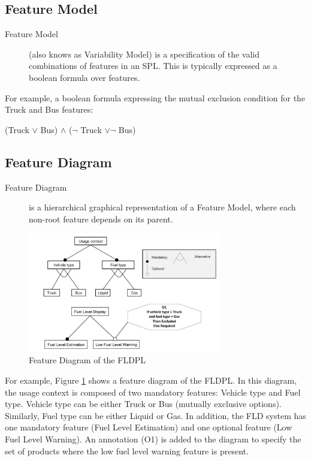 \documentclass[11pt]{article}
\begin{document}
\subsection{Feature Model}

\begin{description}

\item[Feature Model]
(also knows as Variability Model) is a specification of the valid combinations of features in an SPL. This is typically expressed as a boolean formula over features.

\end{description}

For example, a boolean formula expressing the mutual exclusion condition for the Truck and Bus features:

(Truck $\vee$ Bus) $\wedge$ ($\neg$ Truck $\vee \neg$ Bus)

\subsection{Feature Diagram}

\begin{description}

\item[Feature Diagram]
is a hierarchical graphical representation of a Feature Model, where each non-root feature depends on its parent.

\end{description}

\begin{figure}
  \centering
    \includegraphics[width=0.75\textwidth]{FeatureDiagram}
  \caption{Feature Diagram of the FLDPL}
  \label{fig:FeatureDiagram}
\end{figure}

For example, Figure \ref{fig:FeatureDiagram} shows a feature diagram of the FLDPL. In this diagram, the usage context is composed of two mandatory features: Vehicle type and Fuel type. Vehicle type can be either Truck or Bus (mutually exclusive options). Similarly, Fuel type can be either Liquid or Gas. In addition, the FLD system has one mandatory feature (Fuel Level Estimation) and one optional feature (Low Fuel Level Warning). An annotation (O1) is added to the diagram to specify the set of products where the low fuel level warning feature is present.
\end{document}
